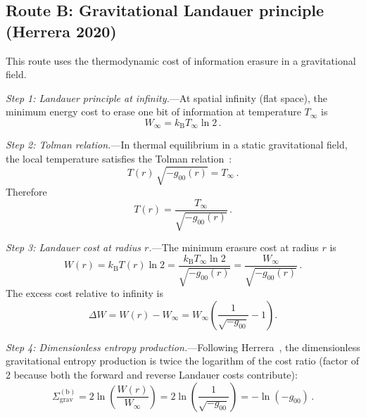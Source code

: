 \documentclass[aps,prd,preprint,superscriptaddress,longbibliography]{revtex4-2}
\newcommand{\kB}{k_{\mathrm{B}}}
\newcommand{\Sgrav}{\Sigma_{\mathrm{grav}}}
\begin{document}
\subsection{Route B: Gravitational Landauer principle (Herrera 2020)}
\label{sec:routeB}

This route uses the thermodynamic cost of information erasure in
a gravitational field.

\emph{Step 1: Landauer principle at infinity.}---At spatial infinity
(flat space), the minimum energy cost to erase one bit of information
at temperature $T_\infty$ is~\cite{Landauer1961}
\begin{equation}
  W_\infty = \kB T_\infty \ln 2\,.
  \label{eq:Landauer_inf}
\end{equation}

\emph{Step 2: Tolman relation.}---In thermal equilibrium in a static
gravitational field, the local temperature satisfies the Tolman
relation~\cite{Tolman1930}:
\begin{equation}
  T(r)\,\sqrt{-g_{00}(r)} = T_\infty\,.
  \label{eq:Tolman}
\end{equation}
Therefore
\begin{equation}
  T(r) = \frac{T_\infty}{\sqrt{-g_{00}(r)}}\,.
  \label{eq:Tr}
\end{equation}

\emph{Step 3: Landauer cost at radius $r$.}---The minimum erasure cost
at radius $r$ is
\begin{equation}
  W(r) = \kB T(r)\ln 2 = \frac{\kB T_\infty \ln 2}{\sqrt{-g_{00}(r)}}
  = \frac{W_\infty}{\sqrt{-g_{00}(r)}}\,.
  \label{eq:Wr}
\end{equation}
The excess cost relative to infinity is
\begin{equation}
  \Delta W = W(r) - W_\infty
  = W_\infty\!\left(\frac{1}{\sqrt{-g_{00}}} - 1\right).
  \label{eq:DeltaW}
\end{equation}

\emph{Step 4: Dimensionless entropy production.}---Following
Herrera~\cite{Herrera2020}, the dimensionless gravitational entropy
production is twice the logarithm of the cost ratio (factor of 2
because both the forward and reverse Landauer costs contribute):
\begin{equation}
  \Sgrav^{(\mathrm{b})} = 2\ln\!\left(\frac{W(r)}{W_\infty}\right)
  = 2\ln\!\left(\frac{1}{\sqrt{-g_{00}}}\right)
  = -\ln(-g_{00})\,.
  \label{eq:Sigma_b}
\end{equation}
\end{document}
